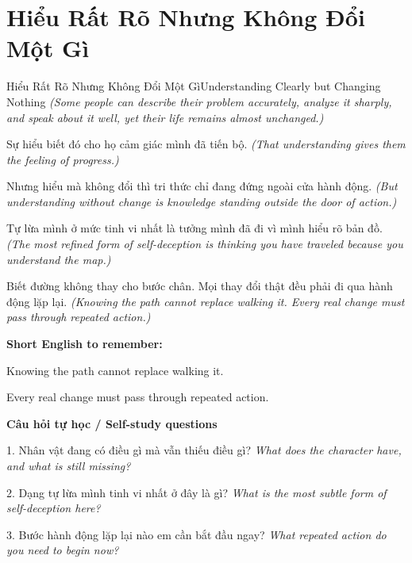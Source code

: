 \section{Hiểu Rất Rõ Nhưng Không Đổi Một Gì}
\begin{truyen}{Hiểu Rất Rõ Nhưng Không Đổi Một Gì}{Understanding Clearly but Changing Nothing}
\textit{(Some people can describe their problem accurately, analyze it sharply, and speak about it well, yet their life remains almost unchanged.)}

Sự hiểu biết đó cho họ cảm giác mình đã tiến bộ.
\textit{(That understanding gives them the feeling of progress.)}

Nhưng hiểu mà không đổi thì tri thức chỉ đang đứng ngoài cửa hành động.
\textit{(But understanding without change is knowledge standing outside the door of action.)}

Tự lừa mình ở mức tinh vi nhất là tưởng mình đã đi vì mình hiểu rõ bản đồ.
\textit{(The most refined form of self-deception is thinking you have traveled because you understand the map.)}

\end{truyen}

\begin{baihoc}
Biết đường không thay cho bước chân. Mọi thay đổi thật đều phải đi qua hành động lặp lại.
\textit{(Knowing the path cannot replace walking it. Every real change must pass through repeated action.)}
\end{baihoc}

\begin{ghinhoanh}
\textbf{Short English to remember:}

Knowing the path cannot replace walking it.

Every real change must pass through repeated action.

\end{ghinhoanh}

\begin{tuhocnhanh}
\textbf{Câu hỏi tự học / Self-study questions}

1. Nhân vật đang có điều gì mà vẫn thiếu điều gì? \textit{What does the character have, and what is still missing?}

2. Dạng tự lừa mình tinh vi nhất ở đây là gì? \textit{What is the most subtle form of self-deception here?}

3. Bước hành động lặp lại nào em cần bắt đầu ngay? \textit{What repeated action do you need to begin now?}
\end{tuhocnhanh}
\ngancach

